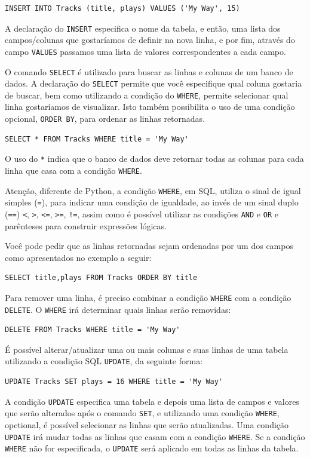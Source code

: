 \beforeverb
\begin{verbatim}
INSERT INTO Tracks (title, plays) VALUES ('My Way', 15)
\end{verbatim}
\afterverb
%
A declaração do {\tt INSERT} especifica o nome da tabela, e então, uma lista
dos campos/colunas que gostaríamos de definir na nova linha, e por fim,
através do campo {\tt VALUES} passamos uma lista de valores correspondentes a
cada campo.

O comando {\tt SELECT} é utilizado para buscar as linhas e colunas de um banco
de dados. A declaração do {\tt SELECT} permite que você especifique qual coluna
gostaria de buscar, bem como utilizando a condição do {\tt WHERE}, permite
selecionar qual linha gostaríamos de visualizar. Isto também possibilita o uso
de uma condição opcional, {\tt ORDER BY}, para ordenar as linhas retornadas.

\beforeverb
\begin{verbatim}
SELECT * FROM Tracks WHERE title = 'My Way'
\end{verbatim}
\afterverb
%
O uso do \verb"*" indica que o banco de dados deve retornar todas as colunas
para cada linha que casa com a condição {\tt WHERE}.

Atenção, diferente de Python, a condição {\tt WHERE}, em SQL, utiliza o sinal
de igual simples (\verb"="), para indicar uma condição de igualdade, ao invés de
um sinal duplo (\verb"==")
\verb"<",
\verb">",
\verb"<=",
\verb">=",
\verb"!=",
assim como é possível utilizar as condições {\tt AND} e {\tt OR} e parênteses
para construir expressões lógicas.

Você pode pedir que as linhas retornadas sejam ordenadas por um dos campos
como apresentados no exemplo a seguir:
\beforeverb
\begin{verbatim}
SELECT title,plays FROM Tracks ORDER BY title
\end{verbatim}
\afterverb
%
Para remover uma linha, é preciso combinar a condição {\tt WHERE} com a
condição {\tt DELETE}. O {\tt WHERE} irá determinar quais linhas serão
removidas:

\beforeverb
\begin{verbatim}
DELETE FROM Tracks WHERE title = 'My Way'
\end{verbatim}
\afterverb
%
É possível alterar/atualizar uma ou mais colunas e suas linhas de uma tabela
utilizando a condição SQL {\tt UPDATE}, da seguinte forma:

\beforeverb
\begin{verbatim}
UPDATE Tracks SET plays = 16 WHERE title = 'My Way'
\end{verbatim}
\afterverb
%
A condição {\tt UPDATE} especifica uma tabela e depois uma lista de campos e
valores que serão alterados após o comando {\tt SET}, e utilizando uma condição
{\tt WHERE}, opctional, é possível selecionar as linhas que serão atualizadas.
Uma condição {\tt UPDATE} irá mudar todas as linhas que casam com a condição
{\tt WHERE}. Se a condição {\tt WHERE} não for especificada, o {\tt UPDATE}
será aplicado em todas as linhas da tabela.

